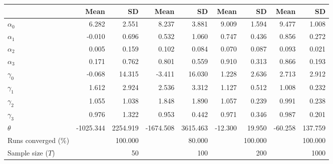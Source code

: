 
\begin{tabular}[t]{lrrrrrrrr}
\toprule
  & Mean & SD & Mean  & SD  & Mean   & SD   & Mean    & SD   \\
\midrule
$\alpha_{0}$ & 6.282 & 2.551 & 8.237 & 3.881 & 9.009 & 1.594 & 9.477 & 1.008\\
$\alpha_{1}$ & -0.010 & 0.696 & 0.532 & 1.060 & 0.747 & 0.436 & 0.856 & 0.272\\
$\alpha_{2}$ & 0.005 & 0.159 & 0.102 & 0.084 & 0.070 & 0.087 & 0.093 & 0.021\\
$\alpha_{3}$ & 0.171 & 0.762 & 0.801 & 0.559 & 0.910 & 0.313 & 0.866 & 0.193\\
$\gamma_{0}$ & -0.068 & 14.315 & -3.411 & 16.030 & 1.228 & 2.636 & 2.713 & 2.912\\
$\gamma_{1}$ & 1.612 & 2.924 & 2.536 & 3.312 & 1.127 & 0.512 & 1.008 & 0.232\\
$\gamma_{2}$ & 1.055 & 1.038 & 1.848 & 1.890 & 1.057 & 0.239 & 0.991 & 0.238\\
$\gamma_{3}$ & 0.976 & 1.322 & 0.953 & 0.442 & 0.971 & 0.346 & 0.987 & 0.201\\
$\theta$ & -1025.344 & 2254.919 & -1674.508 & 3615.463 & -12.300 & 19.950 & -60.258 & 137.759\\
Runs converged (\%) &  & 100.000 &  & 80.000 &  & 100.000 &  & 100.000\\
Sample size ($T$) &  & 50 &  & 100 &  & 200 &  & 1000\\
\bottomrule
\end{tabular}
